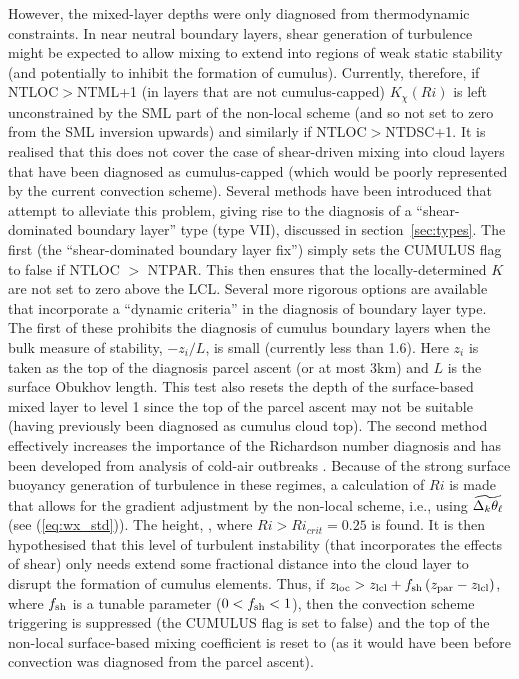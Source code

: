 \documentclass{UMDP_article}
\begin{document}
However, the mixed-layer depths were only diagnosed from thermodynamic
constraints.  In near neutral boundary layers, shear generation of
turbulence might be expected to allow mixing to extend into regions of
weak static stability (and potentially to inhibit the formation of
cumulus).  Currently, therefore, if NTLOC$>$NTML+1 (in layers that are
not cumulus-capped) $K_{\chi}(Ri)$ is left unconstrained by the SML
part of the non-local scheme (and so not set to zero from the SML
inversion upwards) and similarly if NTLOC$>$NTDSC+1.  It is realised
that this does not cover the case of shear-driven mixing into cloud
layers that have been diagnosed as cumulus-capped (which would be
poorly represented by the current convection scheme).  Several methods
have been introduced that attempt to alleviate this problem, giving
rise to the diagnosis of a ``shear-dominated boundary layer'' type
(type VII), discussed in section~\ref{sec:types}.  The first (the
``shear-dominated boundary layer fix'') simply sets the CUMULUS flag
to false if NTLOC $>$ NTPAR.  This then ensures that the
locally-determined $K$ are not set to zero above the LCL.  Several
more rigorous options are available that incorporate a ``dynamic
criteria'' in the diagnosis of boundary layer type.  The first of
these prohibits the diagnosis of cumulus boundary layers when the bulk
measure of stability, $-z_i/L$, is small (currently less than 1.6).  
Here $z_i$ is taken as the top of the diagnosis parcel ascent (or at
most 3km) and $L$ is the surface Obukhov length.  This test also resets 
the depth of the surface-based mixed layer to level 1 since the top of 
the parcel ascent may not be suitable (having previously 
been diagnosed as cumulus cloud top).  The second method
effectively increases the importance of the Richardson number
diagnosis and has been developed from analysis of cold-air outbreaks
\cite[]{bodas-salcedo2012}.  Because of the strong surface buoyancy
generation of turbulence in these regimes, a calculation of $Ri$ is
made that allows for the gradient adjustment by the non-local scheme,
\mbox{i.e.}, using $\widetilde{\Delta_k \theta_{\ell}}$ (see
(\ref{eq:wx_std})).  The height, \zloc, where $Ri>Ri_{crit}=0.25$ is
found.  It is then hypothesised that this level of turbulent
instability (that incorporates the effects of shear) only needs extend
some fractional distance into the cloud layer to disrupt the formation
of cumulus elements.  Thus, if $z_{\rm loc} > z_{\rm lcl} + f_{\rm sh}
\left(z_{\rm par}-z_{\rm lcl}\right) $, where $f_{\rm sh}$ is a tunable
parameter ($0<f_{\rm sh}<1$), then the convection scheme triggering is
suppressed (the CUMULUS flag is set to false) and the top of the
non-local surface-based mixing coefficient is reset to \zhpar (as it
would have been before convection was diagnosed from the parcel
ascent).
\end{document}
